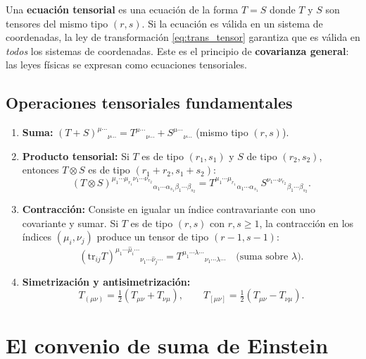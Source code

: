 \begin{importante}
Una \textbf{ecuación tensorial} es una ecuación de la forma $T = S$ donde $T$ y $S$ son tensores del mismo tipo $(r,s)$. Si la ecuación es válida en un sistema de coordenadas, la ley de transformación \eqref{eq:trans_tensor} garantiza que es válida en \emph{todos} los sistemas de coordenadas. Este es el principio de \textbf{covarianza general}: las leyes físicas se expresan como ecuaciones tensoriales.
\end{importante}

\subsection{Operaciones tensoriales fundamentales}

\begin{enumerate}[leftmargin=2em, label=\textbf{\arabic*.}]
  \item \textbf{Suma:} $(T + S)^{\mu\cdots}{}_{\nu\cdots} = T^{\mu\cdots}{}_{\nu\cdots} + S^{\mu\cdots}{}_{\nu\cdots}$ (mismo tipo $(r,s)$).

  \item \textbf{Producto tensorial:} Si $T$ es de tipo $(r_1, s_1)$ y $S$ de tipo $(r_2, s_2)$, entonces $T \otimes S$ es de tipo $(r_1+r_2, s_1+s_2)$:
  \[
    (T \otimes S)^{\mu_1\cdots\mu_{r_1}\nu_1\cdots\nu_{r_2}}{}_{\alpha_1\cdots\alpha_{s_1}\beta_1\cdots\beta_{s_2}}
    = T^{\mu_1\cdots\mu_{r_1}}{}_{\alpha_1\cdots\alpha_{s_1}}\, S^{\nu_1\cdots\nu_{r_2}}{}_{\beta_1\cdots\beta_{s_2}}.
  \]

  \item \textbf{Contracción:} Consiste en igualar un índice contravariante con uno covariante y sumar. Si $T$ es de tipo $(r,s)$ con $r,s \geq 1$, la contracción en los índices $(\mu_i, \nu_j)$ produce un tensor de tipo $(r-1, s-1)$:
  \[
    (\text{tr}_{ij}T)^{\mu_1\cdots\hat\mu_i\cdots}{}_{\nu_1\cdots\hat\nu_j\cdots}
    = T^{\mu_1\cdots\lambda\cdots}{}_{\nu_1\cdots\lambda\cdots}
    \quad \text{(suma sobre }\lambda\text{)}.
  \]

  \item \textbf{Simetrización y antisimetrización:}
  \[
    T_{(\mu\nu)} = \tfrac{1}{2}(T_{\mu\nu} + T_{\nu\mu}), \qquad
    T_{[\mu\nu]} = \tfrac{1}{2}(T_{\mu\nu} - T_{\nu\mu}).
  \]
\end{enumerate}

\section{El convenio de suma de Einstein}

